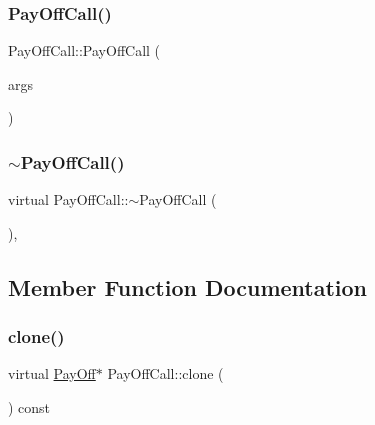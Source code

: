 \hypertarget{classPayOffCall_ae68d6baed8d24536e64e90633d684a59}{}\label{classPayOffCall_ae68d6baed8d24536e64e90633d684a59} 
\subsubsection{\texorpdfstring{Pay\+Off\+Call()}{PayOffCall()}\hspace{0.1cm}{\footnotesize\ttfamily [3/3]}}
{\footnotesize\ttfamily Pay\+Off\+Call\+::\+Pay\+Off\+Call (\begin{DoxyParamCaption}\item[{const \hyperlink{classMJArray}{M\+J\+Array} \&}]{args }\end{DoxyParamCaption})}

\hypertarget{classPayOffCall_a0cab46272abe31e91b04dd835ef0e7ee}{}\label{classPayOffCall_a0cab46272abe31e91b04dd835ef0e7ee} 
\subsubsection{\texorpdfstring{$\sim$\+Pay\+Off\+Call()}{~PayOffCall()}\hspace{0.1cm}{\footnotesize\ttfamily [2/2]}}
{\footnotesize\ttfamily virtual Pay\+Off\+Call\+::$\sim$\+Pay\+Off\+Call (\begin{DoxyParamCaption}{ }\end{DoxyParamCaption})\hspace{0.3cm}{\ttfamily [inline]}, {\ttfamily [virtual]}}



\subsection{Member Function Documentation}
\hypertarget{classPayOffCall_a3eb9cf318975edf458873f812b7e9138}{}\label{classPayOffCall_a3eb9cf318975edf458873f812b7e9138} 
\subsubsection{\texorpdfstring{clone()}{clone()}}
{\footnotesize\ttfamily virtual \hyperlink{classPayOff}{Pay\+Off}$\ast$ Pay\+Off\+Call\+::clone (\begin{DoxyParamCaption}{ }\end{DoxyParamCaption}) const\hspace{0.3cm}{\ttfamily [virtual]}}




